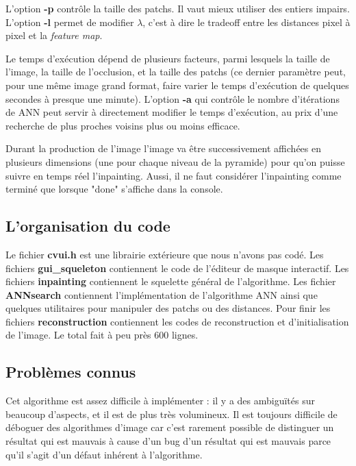 \documentclass[a4paper, 10pt]{article}
\begin{document}
L'option \textbf{-p} contrôle la taille des patchs. Il vaut mieux utiliser des entiers impairs. L'option \textbf{-l} permet de modifier $\lambda$, c'est à dire le tradeoff entre les distances pixel à pixel et la \textit{feature map}.
  
Le temps d'exécution dépend de plusieurs facteurs, parmi lesquels la taille de l'image, la taille de l'occlusion, et la taille des patchs (ce dernier paramètre peut, pour une même image grand format, faire varier le temps d'exécution de quelques secondes à presque une minute). L'option \textbf{-a} qui contrôle le nombre d'itérations de ANN peut servir à directement modifier le temps d'exécution, au prix d'une recherche de plus proches voisins plus ou moins efficace.  
  
Durant la production de l'image l'image va être successivement affichées en plusieurs dimensions (une pour chaque niveau de la pyramide) pour qu'on puisse suivre en temps réel l'inpainting. Aussi, il ne faut considérer l'inpainting comme terminé que lorsque "done" s'affiche dans la console.

\subsection{L'organisation du code}

Le fichier \textbf{cvui.h} est une librairie extérieure que nous n'avons pas codé. Les fichiers \textbf{gui\_squeleton} contiennent le code de l'éditeur de masque interactif. Les fichiers \textbf{inpainting} contiennent le squelette général de l'algorithme. Les fichier \textbf{ANNsearch} contiennent l'implémentation de l'algorithme ANN ainsi que quelques utilitaires pour manipuler des patchs ou des distances. Pour finir les fichiers \textbf{reconstruction} contiennent les codes de reconstruction et d'initialisation de l'image. Le total fait à peu près 600 lignes.  
  
\subsection{Problèmes connus}
  
Cet algorithme est assez difficile à implémenter : il y a des ambiguïtés sur beaucoup d'aspects, et il est de plus très volumineux. Il est toujours difficile de déboguer des algorithmes d'image car c'est rarement possible de distinguer un résultat qui est mauvais à cause d'un bug d'un résultat qui est mauvais parce qu'il s'agit d'un défaut inhérent à l'algorithme.  
  
\end{document}
